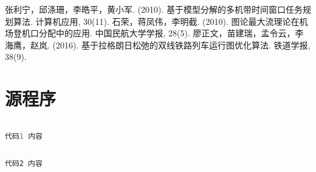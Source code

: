 \documentclass[bwprint]{gmcmthesis}
\begin{document}
\newpage
\begin{thebibliography}{9}%
  张利宁，邱涤珊，李皓平，黄小军. (2010). 基于模型分解的多机带时间窗口任务规划算法. 计算机应用, 30(11).
 石荣，蒋凤伟，李明截. (2010). 图论最大流理论在机场登机口分配中的应用. 中国民航大学学报, 28(5).
 廖正文，苗建瑞，孟令云，李海鹰，赵岚. (2016). 基于拉格朗日松弛的双线铁路列车运行图优化算法. 铁道学报, 38(9).
\end{thebibliography}

 


\newpage
\appendix
\section{源程序}
\begin{lstlisting}[language=python]%设置不同语言即可。

代码1 内容

 \end{lstlisting}

\begin{lstlisting}[language=perl]%设置不同语言即可。

代码2 内容
 \end{lstlisting}
\end{document}
